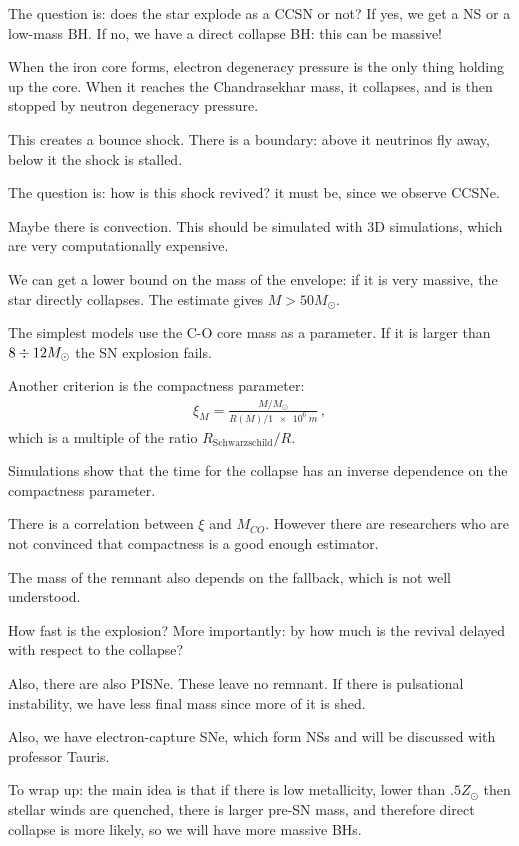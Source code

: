 \documentclass[main.tex]{subfiles}
\begin{document}
The question is: does the star explode as a CCSN or not? 
If yes, we get a NS or a low-mass BH. 
If no, we have a direct collapse BH: this can be massive!

When the iron core forms, electron degeneracy pressure is the only thing holding up the core. 
When it reaches the Chandrasekhar mass, it collapses, and is then stopped by neutron degeneracy pressure. 

This creates a bounce shock. 
There is a boundary: above it neutrinos fly away, below it the shock is stalled. 

The question is: how is this shock revived? it must be, since we observe CCSNe. 

Maybe there is convection. This should be simulated with 3D simulations, which are very computationally expensive. 

We can get a lower bound on the mass of the envelope: if it is very massive, the star directly collapses. 
The estimate gives \(M > 50 M_{\odot}\). 

The simplest models use the C-O core mass as a parameter. If it is larger than \(8 \divisionsymbol 12 M_{\odot}\) the SN explosion fails. 

Another criterion is the compactness parameter: 
%
\begin{align}
\xi_{M} = \frac{M / M_{\odot}}{R(M) / \SI{1e6}{m}}
\,,
\end{align}
%
which is a multiple of the ratio \(R_{\text{Schwarzschild}} / R\). 

Simulations show that the time for the collapse has an inverse dependence on the compactness parameter. 

There is a correlation between \(\xi \) and \(M_{CO}\). 
However there are researchers who are not convinced that compactness is a good enough estimator. 

The mass of the remnant also depends on the fallback, which is not well understood. 

How fast is the explosion? More importantly: by how much is the revival delayed with respect to the collapse? 

Also, there are also PISNe. These leave no remnant. 
If there is pulsational instability, we have less final mass since more of it is shed. 

Also, we have electron-capture SNe, which form NSs and will be discussed with professor Tauris. 

To wrap up: the main idea is that if there is low metallicity, lower than \(\num{.5} Z_{\odot}\) then stellar winds are quenched, there is larger pre-SN mass, and therefore direct collapse is more likely, so we will have more massive BHs. 
\end{document}
